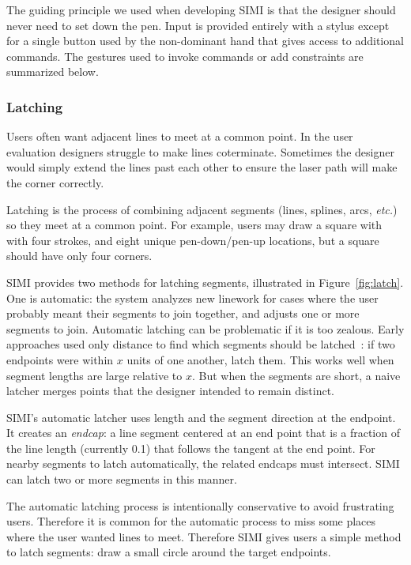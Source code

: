 \documentclass{article}
\begin{document}

The guiding principle we used when developing SIMI is that the
designer should never need to set down the pen. Input is provided
entirely with a stylus except for a single button used by the
non-dominant hand that gives access to additional commands. The
gestures used to invoke commands or add constraints are summarized
below.

\subsubsection{Latching}

Users often want adjacent lines to meet at a common point. In the user
evaluation designers struggle to make lines coterminate. Sometimes the
designer would simply extend the lines past each other to ensure the
laser path will make the corner correctly. 

Latching is the process of combining adjacent segments (lines,
splines, arcs, \textit{etc.}) so they meet at a common point. For
example, users may draw a square with with four strokes, and eight
unique pen-down/pen-up locations, but a square should have only four
corners.

SIMI provides two methods for latching segments, illustrated in
Figure~\ref{fig:latch}. One is automatic: the system analyzes new
linework for cases where the user probably meant their segments to
join together, and adjusts one or more segments to join. Automatic
latching can be problematic if it is too zealous. Early approaches
used only distance to find which segments should be
latched~\cite{herot-latch-corners}: if two endpoints were within $x$
units of one another, latch them. This works well when segment lengths
are large relative to $x$. But when the segments are short, a naive
latcher merges points that the designer intended to remain distinct.

SIMI's automatic latcher uses length and the segment direction at the
endpoint. It creates an \textit{endcap}: a line segment centered at an
end point that is a fraction of the line length (currently 0.1) that
follows the tangent at the end point. For nearby segments to latch
automatically, the related endcaps must intersect. SIMI can latch two
or more segments in this manner.

The automatic latching process is intentionally conservative to avoid
frustrating users. Therefore it is common for the automatic process to
miss some places where the user wanted lines to meet. Therefore SIMI
gives users a simple method to latch segments: draw a small circle
around the target endpoints.
\end{document}
